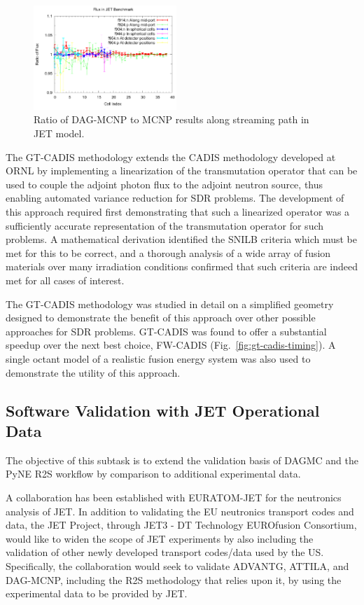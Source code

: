\begin{figure}
\centering
\includegraphics[width=0.48\textwidth]{imgs/jet-streaming-benchmark.png}
\caption{\label{fig:jet-streaming-benchmark}Ratio of DAG-MCNP to MCNP results
  along streaming path in JET model.}
\end{figure}

The \gls{GT-CADIS} methodology extends the \gls{CADIS} methodology developed
at \gls{ORNL} by implementing a linearization of the transmutation operator
that can be used to couple the adjoint photon flux to the adjoint neutron
source, thus enabling automated variance reduction for \gls{SDR} problems.
The development of this approach required first demonstrating that such a
linearized operator was a sufficiently accurate representation of the
transmutation operator for such problems.  A mathematical derivation
identified the \gls{SNILB} criteria which must be met for this to be correct,
and a thorough analysis of a wide array of fusion materials over many
irradiation conditions confirmed that such criteria are indeed met for all
cases of interest.

The \gls{GT-CADIS} methodology was studied in detail on a simplified geometry
designed to demonstrate the benefit of this approach over other possible
approaches for \gls{SDR} problems.  \gls{GT-CADIS} was found to offer a
substantial speedup over the next best choice, \gls{FW-CADIS}
(Fig.\ \ref{fig:gt-cadis-timing}).  A single octant model of a realistic fusion
energy system was also used to demonstrate the utility of this approach.

\subsection{Software Validation with JET Operational Data}

The objective of this subtask is to extend the validation basis of \gls{DAGMC}
and the PyNE \gls{R2S} workflow by comparison to additional experimental data.

A collaboration has been established with EURATOM-JET for the neutronics
analysis of JET.  In addition to validating the EU neutronics transport codes
and data, the JET Project, through JET3 - DT Technology EUROfusion Consortium,
would like to widen the scope of JET experiments by also including the
validation of other newly developed transport codes/data used by the US.
Specifically, the collaboration would seek to validate ADVANTG, ATTILA, and
DAG-MCNP, including the \gls{R2S} methodology that relies upon it, by using
the experimental data to be provided by JET.

